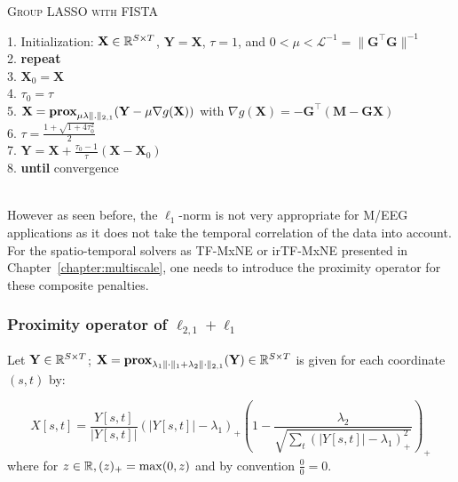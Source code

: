 {\fontsize{4}{4}\selectfont
\begin{algorithm}[t]
\caption{\textsc{Group LASSO with FISTA}}

1. Initialization: $\mathbf{X}\in\mathbb{R}^{S\times T}$, $\mathbf{Y}=\mathbf{X}$, $\tau=1$, and $0 < \mu < \mathcal{L}^{-1} = \|\mathbf{G}^\top\mathbf{G}\|^{-1}$\\
2. \textbf{repeat}\\
3. \hspace{4pt} $\mathbf{X}_0 = \mathbf{X}$\\
4. \hspace{4pt} $\tau_0 = \tau$\\
5. \hspace{4pt} $\mathbf{X} = \textbf{prox}_{\mu\lambda\|.\|_{2,1}}(\mathbf{Y}-\mu\nabla g(\mathbf{X}))$ with $\nabla g(\mathbf{X})= -\mathbf{G}^\top(\mathbf{M}-\mathbf{GX})$ \\
6. \hspace{4pt} $\tau = \frac{1+\sqrt{1+4\tau^2_0}}{2}$\\
7. \hspace{4pt} $\mathbf{Y} = \mathbf{X} + \frac{\tau_0 - 1}{\tau}(\mathbf{X}-\mathbf{X}_0)$\\
8. \textbf{until} convergence\\
\\
\label{alg:FISTA}
\end{algorithm}
}

However as seen before, the $\ell_1$-norm is not very appropriate for M/EEG applications as it does not take the temporal correlation of the data into account. For the spatio-temporal solvers as TF-MxNE or irTF-MxNE presented in Chapter~\ref{chapter:multiscale}, one needs to introduce the proximity operator for these composite penalties.

\adjustwidth{1em}{0pt}
\subsubsection*{Proximity operator of $\ell_{2,1}+\ell_1$}
Let $\mathbf{Y}\in\mathbb{R}^{S\times T}$; $\mathbf{X}=\textbf{prox}_{\lambda_1\|\cdot\|_1+\lambda_2\|\cdot\|_{2,1}}(\mathbf{Y})\in\mathbb{R}^{S\times T}$ is given for each coordinate $(s,t)$ by:

\begin{equation} \label{prox_mixed}
	X[s,t]=\frac{Y[s,t]}{|Y[s,t]|}(|Y[s,t]|-\lambda_1)_+\left(1-\frac{\lambda_2}{\sqrt{\sum_t(|Y[s,t]|-\lambda_1)_+^{2}}}\right)_+
\end{equation}
where for $z\in\mathbb{R}, (z)_+ =\max(0,z)$ and by convention $\frac{0}{0}=0$.
\endadjustwidth


